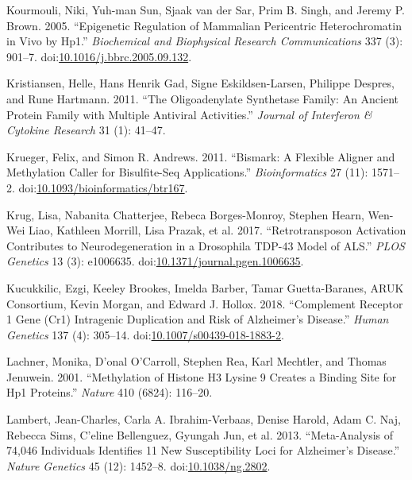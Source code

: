 \documentclass[onehalf,12pt]{beavtex}
\begin{document}
  \hypertarget{ref-KourmouliEpigeneticregulationmammalian2005}{}
  Kourmouli, Niki, Yuh-man Sun, Sjaak van der Sar, Prim B. Singh, and
  Jeremy P. Brown. 2005. ``Epigenetic Regulation of Mammalian Pericentric
  Heterochromatin in Vivo by Hp1.'' \emph{Biochemical and Biophysical
  Research Communications} 337 (3): 901--7.
  doi:\href{https://doi.org/10.1016/j.bbrc.2005.09.132}{10.1016/j.bbrc.2005.09.132}.
  
  \hypertarget{ref-Kristiansenoligoadenylatesynthetasefamily2011}{}
  Kristiansen, Helle, Hans Henrik Gad, Signe Eskildsen-Larsen, Philippe
  Despres, and Rune Hartmann. 2011. ``The Oligoadenylate Synthetase
  Family: An Ancient Protein Family with Multiple Antiviral Activities.''
  \emph{Journal of Interferon \& Cytokine Research} 31 (1): 41--47.
  
  \hypertarget{ref-KruegerBismarkflexiblealigner2011a}{}
  Krueger, Felix, and Simon R. Andrews. 2011. ``Bismark: A Flexible
  Aligner and Methylation Caller for Bisulfite-Seq Applications.''
  \emph{Bioinformatics} 27 (11): 1571--2.
  doi:\href{https://doi.org/10.1093/bioinformatics/btr167}{10.1093/bioinformatics/btr167}.
  
  \hypertarget{ref-KrugRetrotransposonactivationcontributes2017a}{}
  Krug, Lisa, Nabanita Chatterjee, Rebeca Borges-Monroy, Stephen Hearn,
  Wen-Wei Liao, Kathleen Morrill, Lisa Prazak, et al. 2017.
  ``Retrotransposon Activation Contributes to Neurodegeneration in a
  Drosophila TDP-43 Model of ALS.'' \emph{PLOS Genetics} 13 (3): e1006635.
  doi:\href{https://doi.org/10.1371/journal.pgen.1006635}{10.1371/journal.pgen.1006635}.
  
  \hypertarget{ref-KucukkilicComplementreceptorgene2018}{}
  Kucukkilic, Ezgi, Keeley Brookes, Imelda Barber, Tamar Guetta-Baranes,
  ARUK Consortium, Kevin Morgan, and Edward J. Hollox. 2018. ``Complement
  Receptor 1 Gene (Cr1) Intragenic Duplication and Risk of Alzheimer's
  Disease.'' \emph{Human Genetics} 137 (4): 305--14.
  doi:\href{https://doi.org/10.1007/s00439-018-1883-2}{10.1007/s00439-018-1883-2}.
  
  \hypertarget{ref-LachnerMethylationhistoneH32001}{}
  Lachner, Monika, D\a'onal O'Carroll, Stephen Rea, Karl Mechtler, and
  Thomas Jenuwein. 2001. ``Methylation of Histone H3 Lysine 9 Creates a
  Binding Site for Hp1 Proteins.'' \emph{Nature} 410 (6824): 116--20.
  
  \hypertarget{ref-LambertMetaanalysis740462013}{}
  Lambert, Jean-Charles, Carla A. Ibrahim-Verbaas, Denise Harold, Adam C.
  Naj, Rebecca Sims, C\a'eline Bellenguez, Gyungah Jun, et al. 2013.
  ``Meta-Analysis of 74,046 Individuals Identifies 11 New Susceptibility
  Loci for Alzheimer's Disease.'' \emph{Nature Genetics} 45 (12): 1452--8.
  doi:\href{https://doi.org/10.1038/ng.2802}{10.1038/ng.2802}.
  
\end{document}
